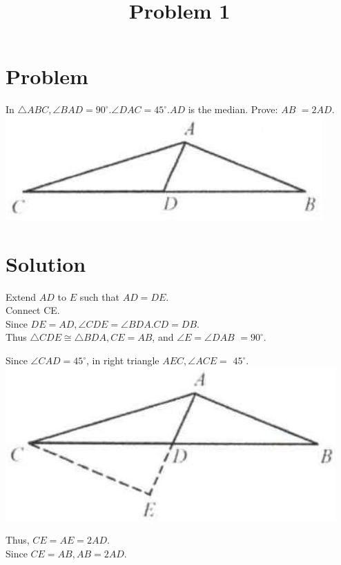 \documentclass{article}
\title{Problem 1}
\date{}
\begin{document}
\maketitle

\section*{Problem}
In \(\triangle A B C, \angle B A D=90^{\circ} . \angle D A C=45^{\circ} . A D\) is the median. Prove: \(A B\) \(=2 A D\).\\
\centering
\includegraphics[width=\textwidth]{images/problem_image_1.jpg}

\section*{Solution}
Extend \(A D\) to \(E\) such that \(A D=D E\).\\
Connect CE.\\
Since \(D E=A D, \angle C D E=\angle B D A . C D=D B\).\\
Thus \(\triangle C D E \cong \triangle B D A, C E=A B\), and \(\angle E=\angle D A B\) \(=90^{\circ}\).

Since \(\angle C A D=45^{\circ}\), in right triangle \(A E C, \angle A C E=\) \(45^{\circ}\).\\
\centering
\includegraphics[width=\textwidth]{images/reasoning_image_1.jpg}

Thus, \(C E=A E=2 A D\).\\
Since \(C E=A B, A B=2 A D\).
\end{document}
